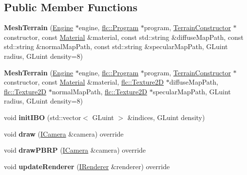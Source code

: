 \subsection*{Public Member Functions}
\begin{DoxyCompactItemize}
\item 
\mbox{\label{classflw_1_1flf_1_1MeshTerrain_a7a15826757332e1a22b1235f4995460e}} 
{\bfseries Mesh\+Terrain} (\hyperlink{classflw_1_1Engine}{Engine} $\ast$engine, \hyperlink{classflw_1_1flc_1_1Program}{flc\+::\+Program} $\ast$program, \hyperlink{classflw_1_1flf_1_1TerrainConstructor}{Terrain\+Constructor} $\ast$constructor, const \hyperlink{classflw_1_1flf_1_1Material}{Material} \&material, const std\+::string \&diffuse\+Map\+Path, const std\+::string \&normal\+Map\+Path, const std\+::string \&specular\+Map\+Path, G\+Luint radius, G\+Luint density=8)
\item 
\mbox{\label{classflw_1_1flf_1_1MeshTerrain_ac64f0b15edb782474b3e8aefb05e90d4}} 
{\bfseries Mesh\+Terrain} (\hyperlink{classflw_1_1Engine}{Engine} $\ast$engine, \hyperlink{classflw_1_1flc_1_1Program}{flc\+::\+Program} $\ast$program, \hyperlink{classflw_1_1flf_1_1TerrainConstructor}{Terrain\+Constructor} $\ast$constructor, const \hyperlink{classflw_1_1flf_1_1Material}{Material} \&material, \hyperlink{classflw_1_1flc_1_1Texture2D}{flc\+::\+Texture2D} $\ast$diffuse\+Map\+Path, \hyperlink{classflw_1_1flc_1_1Texture2D}{flc\+::\+Texture2D} $\ast$normal\+Map\+Path, \hyperlink{classflw_1_1flc_1_1Texture2D}{flc\+::\+Texture2D} $\ast$specular\+Map\+Path, G\+Luint radius, G\+Luint density=8)
\item 
\mbox{\label{classflw_1_1flf_1_1MeshTerrain_a8ae334e8ff48295d0f9cb170de3c8488}} 
void {\bfseries init\+I\+BO} (std\+::vector$<$ G\+Luint $>$ \&indices, G\+Luint density)
\item 
\mbox{\label{classflw_1_1flf_1_1MeshTerrain_a6a0a062b7d6efc39cbe4f54706758600}} 
void {\bfseries draw} (\hyperlink{classflw_1_1flf_1_1ICamera}{I\+Camera} \&camera) override
\item 
\mbox{\label{classflw_1_1flf_1_1MeshTerrain_a4bf5d63ee35d329dc4a567bbc5d9540d}} 
void {\bfseries draw\+P\+B\+RP} (\hyperlink{classflw_1_1flf_1_1ICamera}{I\+Camera} \&camera) override
\item 
\mbox{\label{classflw_1_1flf_1_1MeshTerrain_ad2c900f0766fb8649df35ee05e98c5d1}} 
void {\bfseries update\+Renderer} (\hyperlink{classflw_1_1flf_1_1IRenderer}{I\+Renderer} \&renderer) override
\end{DoxyCompactItemize}

